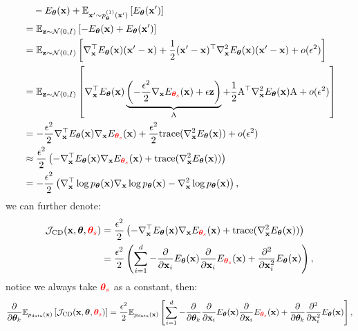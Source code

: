\documentclass{article}
\begin{document}
\begin{equation}
    \begin{aligned}
        &\quad -E_{\bm{\theta}}({\mathbf{x}}) + \mathbb{E}_{{{\mathbf{x}}'} \sim p^{(1)}_{{\bm{\theta}}}({\mathbf{x}}')}\left[ E_{\bm{\theta}}({\mathbf{x}}') \right] \\
        &= \mathbb{E}_{{\mathbf{z}} \sim \mathcal{N}(0, I)}\left[ -E_{\bm{\theta}}({\mathbf{x}}) + E_{\bm{\theta}}({\mathbf{x}}') \right]  \\
        &= \mathbb{E}_{{\mathbf{z}} \sim \mathcal{N}(0, I)}\left[ \nabla_{\mathbf{x}}^\top E_{\bm{\theta}}({\mathbf{x}}) ({\mathbf{x}}'- {\mathbf{x}}) + \frac{1}{2}({\mathbf{x}}'- {\mathbf{x}})^\top \nabla_{\mathbf{x}}^2 E_{\bm{\theta}}({\mathbf{x}}) ({\mathbf{x}}'- {\mathbf{x}}) + o(\epsilon^2) \right] \\
        &= \mathbb{E}_{{\mathbf{z}} \sim \mathcal{N}(0, I)}\left[ \nabla_{\mathbf{x}}^\top E_{\bm{\theta}}({\mathbf{x}})\underbrace{\left( - \frac{\epsilon^2}{2}\nabla_{\mathbf{x}} E_{\textcolor{red}{{\bm{\theta}}_s}}({\mathbf{x}}) + \epsilon {\mathbf{z}} \right)}_{\text{A}} + \frac{1}{2}\text{A}^\top \nabla_{\mathbf{x}}^2 E_{\bm{\theta}}({\mathbf{x}})\text{A} + o(\epsilon^2)\right] \\
        &= -\frac{\epsilon^2}{2}\nabla_{\mathbf{x}}^\top E_{{\bm{\theta}}}({\mathbf{x}}) \nabla_{\mathbf{x}} E_{{\textcolor{red}{{\bm{\theta}}_s}}}({\mathbf{x}}) + \frac{\epsilon^2}{2}\mathrm{trace}(\nabla_{\mathbf{x}}^2E_{\bm{\theta}}({\mathbf{x}})) + o(\epsilon^2) \\
        &\approx \frac{\epsilon^2}{2}\left( -\nabla_{\mathbf{x}}^\top E_{\bm{\theta}}({\mathbf{x}}) \nabla_{\mathbf{x}} E_{\textcolor{red}{{\bm{\theta}}_s}}({\mathbf{x}}) + \mathrm{trace}(\nabla_{\mathbf{x}}^2E_{\bm{\theta}}({\mathbf{x}}))\right) \\
        &= -\frac{\epsilon^2}{2}\left(\nabla_{\mathbf{x}}^\top\log p_{\bm{\theta}}({\mathbf{x}})\nabla_{\mathbf{x}}\log p_{\bm{\theta}}({\mathbf{x}}) - \nabla_{\mathbf{x}}^2\log p_{\bm{\theta}}({\mathbf{x}})\right),
    \end{aligned}
\end{equation}
we can further denote:
\begin{equation}
    \begin{aligned}
        \mathcal{J}_{\text{CD}}({\mathbf{x}}, {\bm{\theta}}, \textcolor{red}{{\bm{\theta}}_s}) 
        &= \frac{\epsilon^2}{2}\left( -\nabla_{\mathbf{x}}^\top E_{\bm{\theta}}({\mathbf{x}}) \nabla_{\mathbf{x}} E_{\textcolor{red}{{\bm{\theta}}_s}}({\mathbf{x}}) + \mathrm{trace}(\nabla_{\mathbf{x}}^2E_{\bm{\theta}}({\mathbf{x}}))\right) \\
        &= \frac{\epsilon^2}{2}\left(\sum_{i=1}^d -\frac{\partial}{\partial {\mathbf{x}}_i}E_{\bm{\theta}}({\mathbf{x}})\frac{\partial}{\partial {\mathbf{x}}_i}E_{\textcolor{red}{{\bm{\theta}}_s}}({\mathbf{x}}) + \frac{\partial^2}{\partial {\mathbf{x}}_i^2}E_{\bm{\theta}}({\mathbf{x}})\right),
    \end{aligned}
\end{equation}
notice we always take $\textcolor{red}{{\bm{\theta}}_s}$ as a constant, then:
\begin{equation}
    \frac{\partial}{\partial {\bm{\theta}}_k} \mathbb{E}_{p_{\rm{data}}({\mathbf{x}})}\left[ \mathcal{J}_{\text{CD}}({\mathbf{x}}, {\bm{\theta}}, \textcolor{red}{{\bm{\theta}}_s}) \right] = \frac{\epsilon^2}{2}\mathbb{E}_{p_{\rm{data}}({\mathbf{x}})}\left[\sum_{i=1}^d -\frac{\partial}{\partial {\bm{\theta}}_k} \frac{\partial}{\partial {\mathbf{x}}_i}E_{\bm{\theta}}({\mathbf{x}})\frac{\partial}{\partial {\mathbf{x}}_i}E_{\textcolor{red}{{\bm{\theta}}_s}}({\mathbf{x}}) + \frac{\partial}{\partial {\bm{\theta}}_k}\frac{\partial^2}{\partial {\mathbf{x}}_i^2}E_{\bm{\theta}}({\mathbf{x}})\right],
\end{equation}
\end{document}
